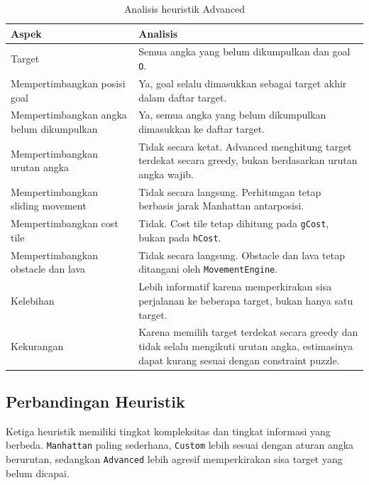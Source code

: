 \begin{table}[H]
	\centering
	\caption{Analisis heuristik Advanced}
	\begin{tabular}{|p{4cm}|p{10cm}|}
		\hline
		\rowcolor{orange!20}
		\textbf{Aspek} & \textbf{Analisis} \\
		\hline
		Target & Semua angka yang belum dikumpulkan dan goal \texttt{O}. \\
		\hline
		Mempertimbangkan posisi goal & Ya, goal selalu dimasukkan sebagai target akhir dalam daftar target. \\
		\hline
		Mempertimbangkan angka belum dikumpulkan & Ya, semua angka yang belum dikumpulkan dimasukkan ke daftar target. \\
		\hline
		Mempertimbangkan urutan angka & Tidak secara ketat. Advanced menghitung target terdekat secara greedy, bukan berdasarkan urutan angka wajib. \\
		\hline
		Mempertimbangkan sliding movement & Tidak secara langsung. Perhitungan tetap berbasis jarak Manhattan antarposisi. \\
		\hline
		Mempertimbangkan cost tile & Tidak. Cost tile tetap dihitung pada \texttt{gCost}, bukan pada \texttt{hCost}. \\
		\hline
		Mempertimbangkan obstacle dan lava & Tidak secara langsung. Obstacle dan lava tetap ditangani oleh \texttt{MovementEngine}. \\
		\hline
		Kelebihan & Lebih informatif karena memperkirakan sisa perjalanan ke beberapa target, bukan hanya satu target. \\
		\hline
		Kekurangan & Karena memilih target terdekat secara greedy dan tidak selalu mengikuti urutan angka, estimasinya dapat kurang sesuai dengan constraint puzzle. \\
		\hline
	\end{tabular}
\end{table}

\subsection{Perbandingan Heuristik}

Ketiga heuristik memiliki tingkat kompleksitas dan tingkat informasi yang berbeda. 
\texttt{Manhattan} paling sederhana, \texttt{Custom} lebih sesuai dengan aturan angka berurutan, sedangkan \texttt{Advanced} lebih agresif memperkirakan sisa target yang belum dicapai.

